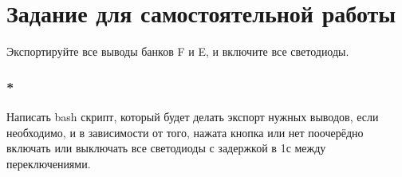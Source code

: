 \section{Задание для самостоятельной работы}
Экспортируйте все выводы банков F и E, и включите все светодиоды.

\subsubsection{*} Написать bash скрипт, который будет делать экспорт нужных выводов, если необходимо, и в зависимости от того, нажата кнопка или нет поочерёдно включать или выключать все светодиоды с задержкой в 1с между переключениями. 